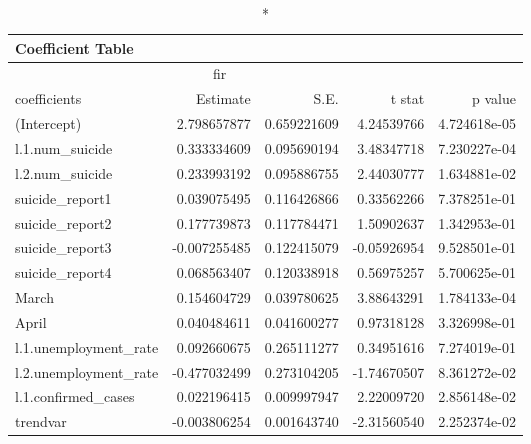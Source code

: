 \begin{longtable}{lrrrr}
\caption*{
{\large Coefficient Table}
} \\ 
\toprule
\multicolumn{4}{c}{fir} &  \\ 
\cmidrule(lr){1-4}
coefficients & Estimate & S.E. & t stat & p value \\ 
\midrule
(Intercept) & 2.798657877 & 0.659221609 & 4.24539766 & 4.724618e-05 \\ 
l.1.num\_suicide & 0.333334609 & 0.095690194 & 3.48347718 & 7.230227e-04 \\ 
l.2.num\_suicide & 0.233993192 & 0.095886755 & 2.44030777 & 1.634881e-02 \\ 
suicide\_report1 & 0.039075495 & 0.116426866 & 0.33562266 & 7.378251e-01 \\ 
suicide\_report2 & 0.177739873 & 0.117784471 & 1.50902637 & 1.342953e-01 \\ 
suicide\_report3 & -0.007255485 & 0.122415079 & -0.05926954 & 9.528501e-01 \\ 
suicide\_report4 & 0.068563407 & 0.120338918 & 0.56975257 & 5.700625e-01 \\ 
March & 0.154604729 & 0.039780625 & 3.88643291 & 1.784133e-04 \\ 
April & 0.040484611 & 0.041600277 & 0.97318128 & 3.326998e-01 \\ 
l.1.unemployment\_rate & 0.092660675 & 0.265111277 & 0.34951616 & 7.274019e-01 \\ 
l.2.unemployment\_rate & -0.477032499 & 0.273104205 & -1.74670507 & 8.361272e-02 \\ 
l.1.confirmed\_cases & 0.022196415 & 0.009997947 & 2.22009720 & 2.856148e-02 \\ 
trendvar & -0.003806254 & 0.001643740 & -2.31560540 & 2.252374e-02 \\ 
\bottomrule
\end{longtable}

